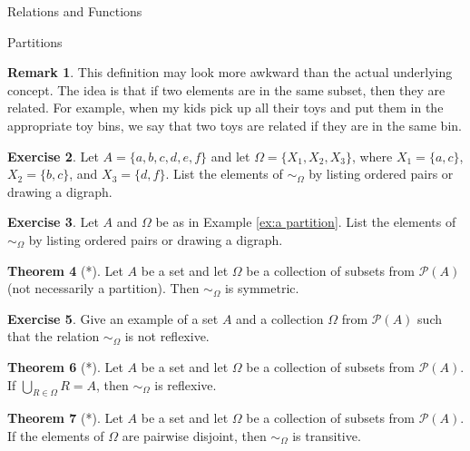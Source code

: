 \documentclass[11pt]{article}
\theoremstyle{definition}
\newtheorem{theorem}{Theorem}[section]
\newtheorem{exercise}[theorem]{Exercise}
\newtheorem{remark}[theorem]{Remark}
\begin{document}
\begin{section}{Relations and Functions}
\begin{subsection}{Partitions}
\begin{remark}
This definition may look more awkward than the actual underlying concept.  The idea is that if two elements are in the same subset, then they are related.  For example, when my kids pick up all their toys and put them in the appropriate toy bins, we say that two toys are related if they are in the same bin.
\end{remark}

\begin{exercise}
Let $A=\{a,b,c,d,e,f\}$ and let $\Omega=\{X_{1},X_{2},X_{3}\}$, where $X_{1}=\{a,c\}$, $X_{2}=\{b,c\}$, and $X_{3}=\{d,f\}$.  List the elements of $\sim_{\Omega}$ by listing ordered pairs or drawing a digraph.
\end{exercise}

\begin{exercise}
Let $A$ and $\Omega$ be as in Example \ref{ex:a partition}.  List the elements of $\sim_{\Omega}$ by listing ordered pairs or drawing a digraph.
\end{exercise}

\begin{theorem}[*]
Let $A$ be a set and let $\Omega$ be a collection of subsets from $\mathcal{P}(A)$ (not necessarily a partition).  Then $\sim_{\Omega}$ is symmetric.
\end{theorem}


\begin{exercise}
Give an example of a set $A$ and a collection $\Omega$ from $\mathcal{P}(A)$ such that the relation $\sim_{\Omega}$ is not reflexive.
\end{exercise}

\begin{theorem}[*]
Let $A$ be a set and let $\Omega$ be a collection of subsets from $\mathcal{P}(A)$.  If $\displaystyle \bigcup_{R\in\Omega}R=A$, then $\sim_{\Omega}$ is reflexive.
\end{theorem}

\begin{theorem}[*]
Let $A$ be a set and let $\Omega$ be a collection of subsets from $\mathcal{P}(A)$.  If the elements of $\Omega$ are pairwise disjoint, then $\sim_{\Omega}$ is transitive.
\end{theorem}


\end{subsection}
\end{section}
\end{document}
